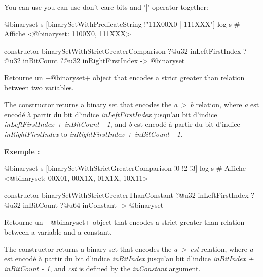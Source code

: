 You can use you can use don't care bits and '|' operator together:
\begin{galgas4}
@binaryset s [binarySetWithPredicateString !"11X00X0 | 111XXX"]
log s # Affiche <@binaryset: 1100X0, 111XXX>
\end{galgas4}





\begin{galgas4box}
constructor binarySetWithStrictGreaterComparison
  ?@u32 inLeftFirstIndex
  ?@u32 inBitCount
  ?@u32 inRightFirstIndex
  -> @binaryset
\end{galgas4box}


Retourne un \ggsq+@binaryset+ object that encodes a strict greater than relation between two variables.

The constructor returns a binary set that encodes the \emph{a~>~b} relation, where \emph{a} est encodé à partir du bit d'indice \emph{inLeftFirstIndex} jusqu'au bit d'indice \emph{inLeftFirstIndex  + inBitCount - 1}, and \emph{b} est encodé à partir du bit d'indice \emph{inRightFirstIndex} to \emph{inRightFirstIndex + inBitCount - 1}.

\textbf{Exemple :}
\begin{galgas4}
@binaryset s [binarySetWithStrictGreaterComparison !0 !2 !3]
log s # Affiche <@binaryset: 00X01, 00X1X, 01X1X, 10X11>
\end{galgas4}





\begin{galgas4box}
constructor binarySetWithStrictGreaterThanConstant
  ?@u32 inLeftFirstIndex
  ?@u32 inBitCount
  ?@u64 inConstant
  -> @binaryset
\end{galgas4box}


Retourne un \ggsq+@binaryset+ object that encodes a strict greater than relation between a variable and a constant.

The constructor returns a binary set that encodes the \emph{a~>~cst} relation, where \emph {a} est encodé à partir du bit d'indice \emph{inBitIndex} jusqu'au bit d'indice \emph{inBitIndex  + inBitCount - 1}, and \emph{cst} is defined by the \emph{inConstant} argument.





